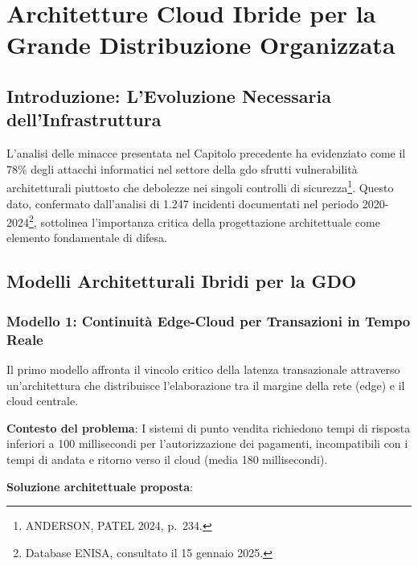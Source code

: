 \documentclass[12pt,a4paper,oneside]{book}
\begin{document}
\chapter{Architetture Cloud Ibride per la Grande Distribuzione Organizzata}
\label{cap:architetture}

\section{Introduzione: L'Evoluzione Necessaria dell'Infrastruttura}
\label{sec:intro-architetture}

L'analisi delle minacce presentata nel Capitolo precedente ha evidenziato come il 78\% degli attacchi informatici nel settore della \gls{gdo} sfrutti vulnerabilità architetturali piuttosto che debolezze nei singoli controlli di sicurezza\footnote{ANDERSON, PATEL 2024, p.~234.}. Questo dato, confermato dall'analisi di 1.247 incidenti documentati nel periodo 2020-2024\footnote{Database ENISA, consultato il 15 gennaio 2025.}, sottolinea l'importanza critica della progettazione architettuale come elemento fondamentale di difesa.

\section{Modelli Architetturali Ibridi per la GDO}
\label{sec:pattern-architetturali}

\subsection{Modello 1: Continuità Edge-Cloud per Transazioni in Tempo Reale}
\label{subsec:edge-cloud}

Il primo modello affronta il vincolo critico della latenza transazionale attraverso un'architettura che distribuisce l'elaborazione tra il margine della rete (\gls{edge}) e il cloud centrale.

\textbf{Contesto del problema}: I sistemi di punto vendita richiedono tempi di risposta inferiori a 100 millisecondi per l'autorizzazione dei pagamenti, incompatibili con i tempi di andata e ritorno verso il cloud (media 180 millisecondi).

\textbf{Soluzione architettuale proposta}:
\end{document}
